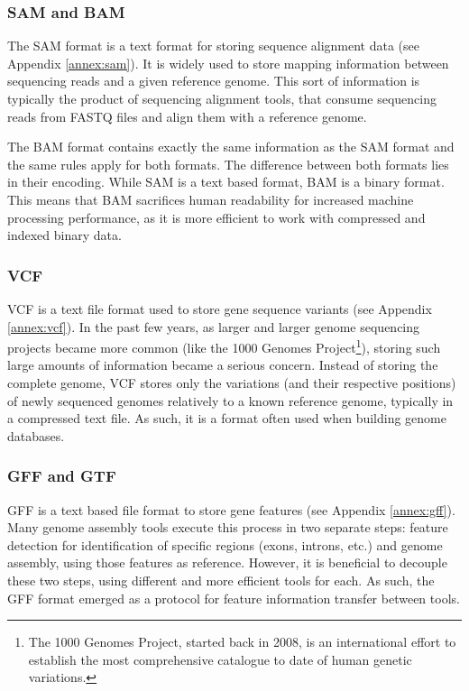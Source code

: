 \subsubsection*{SAM and BAM}

The SAM format is a text format for storing sequence alignment data
\cite{genome:sam} (see Appendix \ref{annex:sam}). It is widely used to store
mapping information between sequencing reads and a given reference genome. This
sort of information is typically the product of sequencing alignment tools, that
consume sequencing reads from FASTQ files and align them with a reference
genome.

The BAM format contains exactly the same information as the SAM format and the
same rules apply for both formats. The difference between both formats lies in
their encoding. While SAM is a text based format, BAM is a binary format. This
means that BAM sacrifices human readability for increased machine processing
performance, as it is more efficient to work with compressed and indexed binary
data.

\subsubsection*{VCF}

VCF is a text file format used to store gene sequence variants \cite{smith13}
(see Appendix \ref{annex:vcf}). In the past few years, as larger and larger
genome sequencing projects became more common (like the 1000 Genomes
Project\footnote{The 1000 Genomes Project, started back in 2008, is an
international effort to establish the most comprehensive catalogue to date of
human genetic variations.}), storing such large amounts of information became a
serious concern. Instead of storing the complete genome, VCF stores only the
variations (and their respective positions) of newly sequenced genomes
relatively to a known reference genome, typically in a compressed text file. As
such, it is a format often used when building genome databases.

\subsubsection*{GFF and GTF}

GFF is a text based file format to store gene features \cite{sanger11} (see
Appendix \ref{annex:gff}). Many genome assembly tools execute this process in
two separate steps: feature detection for identification of specific regions
(exons, introns, etc.) and genome assembly, using those features as reference.
However, it is beneficial to decouple these two steps, using different and more
efficient tools for each. As such, the GFF format emerged as a protocol for
feature information transfer between tools.

